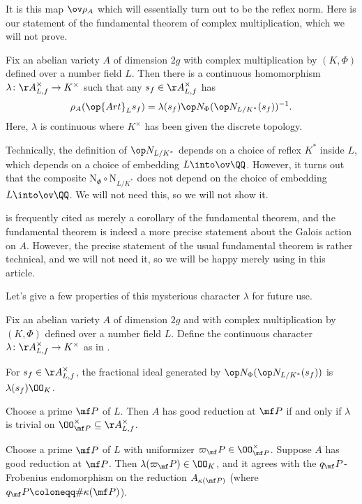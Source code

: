 \documentclass[../thesis.tex]{subfiles}
\begin{document}
It is this map $\ov\rho_A$ which will essentially turn out to be the reflex norm. Here is our statement of the fundamental theorem of complex multiplication, which we will not prove.
\begin{theorem}[Fundamental] \label{thm:fundamental}
	Fix an abelian variety $A$ of dimension $2g$ with complex multiplication by $(K,\Phi)$ defined over a number field $L$. Then there is a continuous homomorphism $\lambda\colon\AA_{L,f}^\times\to K^\times$ such that any $s_f\in\AA_{L,f}^\times$ has
	\[\rho_A(\op{Art}_Ls_f)=\lambda(s_f)\op N_\Phi(\op N_{L/K^*}(s_f))^{-1}.\]
	Here, $\lambda$ is continuous where $K^\times$ has been given the discrete topology.
\end{theorem}
\begin{remark}
	Technically, the definition of $\op N_{L/K^*}$ depends on a choice of reflex $K^*$ inside $L$, which depends on a choice of embedding $L\into\ov\QQ$. However, it turns out that the composite $\mathrm N_\Phi\circ\mathrm N_{L/K^*}$ does not depend on the choice of embedding $L\into\ov\QQ$. We will not need this, so we will not show it.
\end{remark}
\begin{remark}
	 is frequently cited as merely a corollary of the fundamental theorem, and the fundamental theorem is indeed a more precise statement about the Galois action on $A$. However, the precise statement of the usual fundamental theorem is rather technical, and we will not need it, so we will be happy merely using  in this article.
\end{remark}
Let's give a few properties of this mysterious character $\lambda$ for future use.
\begin{proposition} \label{prop:use-fundamental}
	Fix an abelian variety $A$ of dimension $2g$ and with complex multiplication by $(K,\Phi)$ defined over a number field $L$. Define the continuous character $\lambda\colon\AA_{L,f}^\times\to K^\times$ as in .
	\begin{listalph}
		\item For $s_f\in\AA_{L,f}^\times$, the fractional ideal generated by $\op N_{\Phi}(\op N_{L/K^*}(s_f))$ is $\lambda(s_f)\OO_K$.
		\item Choose a prime $\mf P$ of $L$. Then $A$ has good reduction at $\mf P$ if and only if $\lambda$ is trivial on $\OO_{\mf P}^\times\subseteq\AA_{L,f}^\times$.
		\item Choose a prime $\mf P$ of $L$ with uniformizer $\varpi_\mf P\in\OO_{\mf P}^\times$. Suppose $A$ has good reduction at $\mf P$. Then $\lambda(\varpi_\mf P)\in\OO_K$, and it agrees with the $q_\mf P$-Frobenius endomorphism on the reduction $A_{\kappa(\mf P)}$ (where $q_\mf P\coloneqq\#\kappa(\mf P)$).
	\end{listalph}
\end{proposition}
\end{document}
